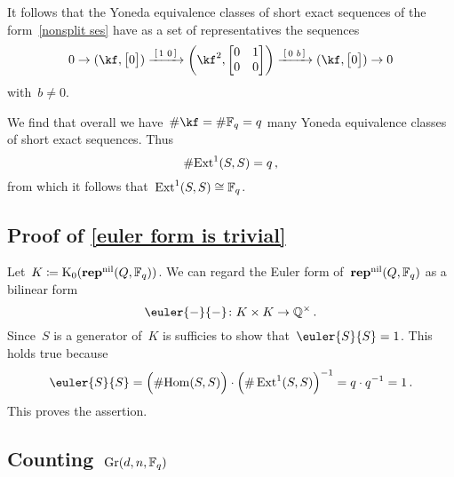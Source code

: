 \documentclass[a4paper,11pt]{scrartcl}
\begin{document}
It follows that the Yoneda equivalence classes of short exact sequences of the form~\eqref{nonsplit ses} have as a set of representatives the sequences
\[ 
  0
  \to
  (\kf, \begin{bmatrix} 0 \end{bmatrix})
  \xlongto{ \begin{bsmallmatrix} 1 & 0 \end{bsmallmatrix} }
  \biggl( \kf^2, \begin{bmatrix} 0 & 1 \\ 0 & 0 \end{bmatrix} \biggr)
  \xlongto{ \begin{bsmallmatrix} 0 & b \end{bsmallmatrix} }
  (\kf, \begin{bmatrix} 0 \end{bmatrix})
  \to
  0
\]
with~$b \neq 0$.

We find that overall we have~$\counting \kf = \counting \Finite_q = q$ many Yoneda equivalence classes of short exact sequences.
Thus
\[
  \# {\operatorname{Ext}^1(S,S)}
  =
  q \,,
\]
from which it follows that~$\operatorname{Ext}^1(S,S) \cong \mathbb{F}_q$.



\subsection{Proof of \cref{euler form is trivial}}
\label{proof of euler form is trivial}

Let~$K \coloneqq \operatorname{K}_0(\mathbf{rep}^{\mathrm{nil}}(Q, \mathbb{F}_q))$.
We can regard the Euler form of~$\mathbf{rep}^{\mathrm{nil}}(Q, \mathbb{F}_q)$ as a bilinear form
\[
  \euler{-}{-}
  \colon
  K \times K
  \to
  \Rational^\times \,.
\]
Since~$S$ is a generator of~$K$ is sufficies to show that~$\euler{S}{S} = 1$.
This holds true because
\[
  \euler{S}{S}
  =
  \Bigl( \counting {\Hom(S,S)} \Bigr)
  \cdot
  \Bigl( \counting \Ext^1(S,S) \Bigr)^{-1}
  =
  q \cdot q^{-1}
  =
  1 \,.
\]
This proves the assertion.


\subsection{Counting~$\operatorname{Gr}(d, n, \mathbb{F}_q)$}
\end{document}
